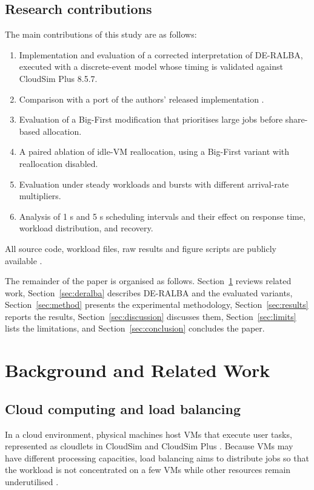 \documentclass[default,sn-mathphys,Numbered]{sn-jnl}
\begin{document}
\subsection{Research contributions}
The main contributions of this study are as follows:
\begin{enumerate}
    \item Implementation and evaluation of a corrected interpretation of DE-RALBA, executed with a discrete-event model whose timing is validated against CloudSim Plus 8.5.7.
    \item Comparison with a port of the authors' released implementation \cite{rehman2025zenodo}.
    \item Evaluation of a Big-First modification that prioritises large jobs before share-based allocation.
    \item A paired ablation of idle-VM reallocation, using a Big-First variant with reallocation disabled.
    \item Evaluation under steady workloads and bursts with different arrival-rate multipliers.
    \item Analysis of 1 s and 5 s scheduling intervals and their effect on response time, workload distribution, and recovery.
\end{enumerate}
All source code, workload files, raw results and figure scripts are publicly available \cite{spikelb2026repo}.

The remainder of the paper is organised as follows. Section~\ref{sec:related} reviews related work, Section~\ref{sec:deralba} describes DE-RALBA and the evaluated variants, Section~\ref{sec:method} presents the experimental methodology, Section~\ref{sec:results} reports the results, Section~\ref{sec:discussion} discusses them, Section~\ref{sec:limits} lists the limitations, and Section~\ref{sec:conclusion} concludes the paper.

\section{Background and Related Work}\label{sec:related}

\subsection{Cloud computing and load balancing}
In a cloud environment, physical machines host VMs that execute user tasks, represented as cloudlets in CloudSim \cite{calheiros2011cloudsim} and CloudSim Plus \cite{silvafilho2017cloudsimplus}. Because VMs may have different processing capacities, load balancing aims to distribute jobs so that the workload is not concentrated on a few VMs while other resources remain underutilised \cite{manvi2014resource, singh2016survey}.
\end{document}
